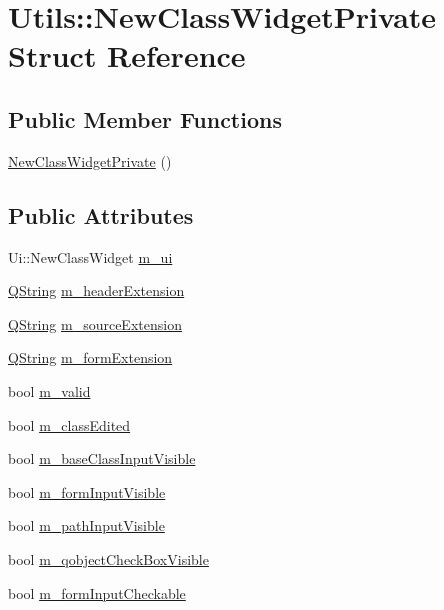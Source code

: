 \hypertarget{struct_utils_1_1_new_class_widget_private}{\section{Utils\-:\-:New\-Class\-Widget\-Private Struct Reference}
\label{struct_utils_1_1_new_class_widget_private}
}
\subsection*{Public Member Functions}
\begin{DoxyCompactItemize}
\item 
\hyperlink{struct_utils_1_1_new_class_widget_private_aca63a023b3ec69de089f4cb5a3b60e0f}{New\-Class\-Widget\-Private} ()
\end{DoxyCompactItemize}
\subsection*{Public Attributes}
\begin{DoxyCompactItemize}
\item 
Ui\-::\-New\-Class\-Widget \hyperlink{struct_utils_1_1_new_class_widget_private_ac77c98af40bd07fd9d14e4f0e04a7bd5}{m\-\_\-ui}
\item 
\hyperlink{group___u_a_v_objects_plugin_gab9d252f49c333c94a72f97ce3105a32d}{Q\-String} \hyperlink{struct_utils_1_1_new_class_widget_private_aa2c6dc307213250a01848e1b0948e9ce}{m\-\_\-header\-Extension}
\item 
\hyperlink{group___u_a_v_objects_plugin_gab9d252f49c333c94a72f97ce3105a32d}{Q\-String} \hyperlink{struct_utils_1_1_new_class_widget_private_a57663ba2bf51531e42dae77e2b9e9ee3}{m\-\_\-source\-Extension}
\item 
\hyperlink{group___u_a_v_objects_plugin_gab9d252f49c333c94a72f97ce3105a32d}{Q\-String} \hyperlink{struct_utils_1_1_new_class_widget_private_af5f72a25e0ff2277f00f79418b100604}{m\-\_\-form\-Extension}
\item 
bool \hyperlink{struct_utils_1_1_new_class_widget_private_a0a15874cfaa308a9c4d6b476ec89cae6}{m\-\_\-valid}
\item 
bool \hyperlink{struct_utils_1_1_new_class_widget_private_ae5a992cfba229575b4392b57c4f07530}{m\-\_\-class\-Edited}
\item 
bool \hyperlink{struct_utils_1_1_new_class_widget_private_a611c98a1bed9915a49d413b175d8f04e}{m\-\_\-base\-Class\-Input\-Visible}
\item 
bool \hyperlink{struct_utils_1_1_new_class_widget_private_a485151d4b70e4b735b1cd8b395f47163}{m\-\_\-form\-Input\-Visible}
\item 
bool \hyperlink{struct_utils_1_1_new_class_widget_private_a413581a7a468f2da3849013b63932487}{m\-\_\-path\-Input\-Visible}
\item 
bool \hyperlink{struct_utils_1_1_new_class_widget_private_ab1352df8bf86533b49c7554d73460407}{m\-\_\-qobject\-Check\-Box\-Visible}
\item 
bool \hyperlink{struct_utils_1_1_new_class_widget_private_ab96a1a9b91703038e3475355d3cb42cf}{m\-\_\-form\-Input\-Checkable}
\end{DoxyCompactItemize}


